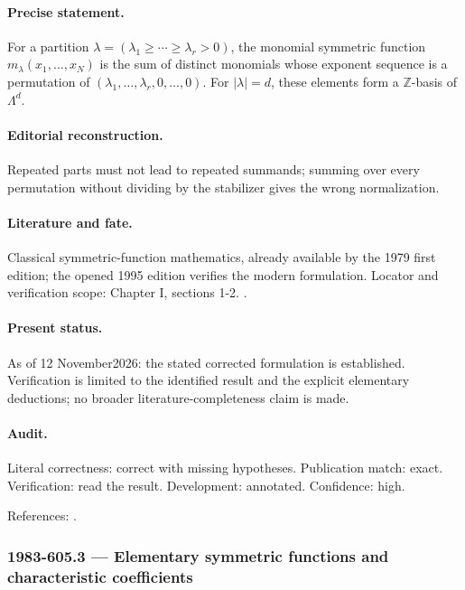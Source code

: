 \paragraph{Precise statement.} For a partition \(\lambda=(\lambda_1\ge\cdots\ge\lambda_r>0)\), the monomial symmetric function \(m_\lambda(x_1,\ldots,x_N)\) is the sum of distinct monomials whose exponent sequence is a permutation of \((\lambda_1,\ldots,\lambda_r,0,\ldots,0)\). For \(|\lambda|=d\), these elements form a \(\mathbb Z\)-basis of \(\Lambda^d\).

\paragraph{Editorial reconstruction.} Repeated parts must not lead to repeated summands; summing over every permutation without dividing by the stabilizer gives the wrong normalization.

\paragraph{Literature and fate.} Classical symmetric-function mathematics, already available by the 1979 first edition; the opened 1995 edition verifies the modern formulation. Locator and verification scope: Chapter I, sections 1-2. \cite{macdonald1995symmetric}.

\paragraph{Present status.} As of 12 November2026: the stated corrected formulation is established. Verification is limited to the identified result and the explicit elementary deductions; no broader literature-completeness claim is made.

\paragraph{Audit.} Literal correctness: correct with missing hypotheses. Publication match: exact. Verification: read the result. Development: annotated. Confidence: high.

\noindent References: \citep{macdonald1995symmetric}.\par

\subsubsection{1983-605.3 --- Elementary symmetric functions and characteristic coefficients}

